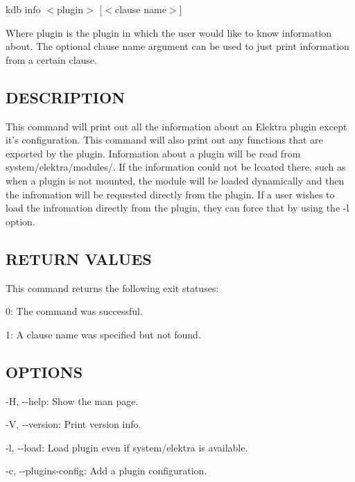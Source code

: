 {\ttfamily kdb info $<$plugin$>$ \mbox{[}$<$clause name$>$\mbox{]}}

Where {\ttfamily plugin} is the plugin in which the user would like to know information about. The optional {\ttfamily clause name} argument can be used to just print information from a certain clause.

\subsection*{D\+E\+S\+C\+R\+I\+P\+T\+I\+O\+N}

This command will print out all the information about an Elektra plugin except it's configuration. This command will also print out any functions that are exported by the plugin. Information about a plugin will be read from {\ttfamily system/elektra/modules/}. If the information could not be lcoated there, such as when a plugin is not mounted, the module will be loaded dynamically and then the infromation will be requested directly from the plugin. If a user wishes to load the infromation directly from the plugin, they can force that by using the {\ttfamily -\/l} option.

\subsection*{R\+E\+T\+U\+R\+N V\+A\+L\+U\+E\+S}

This command returns the following exit statuses\+:


\begin{DoxyItemize}
\item 0\+: The command was successful.
\item 1\+: A {\ttfamily clause name} was specified but not found.
\end{DoxyItemize}

\subsection*{O\+P\+T\+I\+O\+N\+S}


\begin{DoxyItemize}
\item {\ttfamily -\/\+H}, {\ttfamily -\/-\/help}\+: Show the man page.
\item {\ttfamily -\/\+V}, {\ttfamily -\/-\/version}\+: Print version info.
\item {\ttfamily -\/l}, {\ttfamily -\/-\/load}\+: Load plugin even if system/elektra is available.
\item {\ttfamily -\/c}, {\ttfamily -\/-\/plugins-\/config}\+: Add a plugin configuration.
\end{DoxyItemize}


